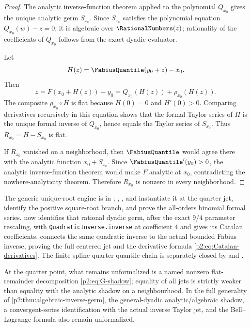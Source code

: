 \documentclass[11pt,oneside]{article}
\numberwithin{equation}{section}
\theoremstyle{definition}
\theoremstyle{remark}
\begin{document}
\begin{proof}
The analytic inverse-function theorem applied to the polynomial $Q_{x_0}$ gives the unique analytic
germ $S_{x_0}$.  Since $S_{x_0}$ satisfies the polynomial equation
$Q_{x_0}(w)-z=0$, it is algebraic over $\RationalNumbers(z)$; rationality of the coefficients of $Q_{x_0}$ follows
from the exact dyadic evaluator.

Let
\[
 H(z)=\FabiusQuantile(y_0+z)-x_0.
\]
Then
\[
 z=F(x_0+H(z))-y_0=Q_{x_0}(H(z))+\rho_{x_0}(H(z)).
\]
The composite $\rho_{x_0}\circ H$ is flat because $H(0)=0$ and $H'(0)>0$.  Comparing derivatives
recursively in this equation shows that the formal Taylor series of $H$ is the unique formal inverse
of $Q_{x_0}$, hence equals the Taylor series of $S_{x_0}$.  Thus $R_{x_0}=H-S_{x_0}$ is flat.

If $R_{x_0}$ vanished on a neighborhood, then $\FabiusQuantile$ would agree there with the analytic function
$x_0+S_{x_0}$.  Since $\FabiusQuantile'(y_0)>0$, the analytic inverse-function theorem would make $F$
analytic at $x_0$, contradicting the nowhere-analyticity theorem.  Therefore $R_{x_0}$ is nonzero in
every neighborhood.
\end{proof}

\begin{resultbox}
The generic unique-root engine is in ;
,
, and
 instantiate it at the quarter jet,
identify the positive square-root branch, and prove the all-orders binomial
formal series.   now identifies that rational
dyadic germ, after the exact $9/4$ parameter rescaling, with
\nolinkurl{QuadraticInverse.inverse} at coefficient $4$ and gives its Catalan
coefficients.   connects the same quadratic
inverse to the actual bounded Fabius inverse, proving the full centered jet and
the derivative formula \eqref{p2:eq:Catalan-derivatives}.  The finite-spline
quarter quantile chain is separately closed by  and
.

At the quarter point, what remains unformalized is a named nonzero
flat-remainder decomposition \eqref{p2:eq:G-shadow}; equality of all jets is
strictly weaker than equality with the analytic shadow on a neighbourhood.
In the full generality of \cref{p2:thm:algebraic-inverse-germ}, the
general-dyadic analytic/algebraic shadow, a convergent-series identification
with the actual inverse Taylor jet, and the Bell--Lagrange formula also remain
unformalized.
\end{resultbox}
\end{document}
